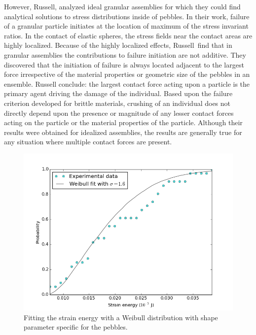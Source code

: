 However, Russell\etal, analyzed ideal granular assemblies for which they could find analytical solutions to stress distributions inside of pebbles.\cite{Russell2009} In their work, failure of a granular particle initiates at the location of maximum of the stress invariant ratios. In the contact of elastic spheres, the stress fields near the contact areas are highly localized. Because of the highly localized effects, Russell\etal~find that in granular assemblies the contributions to failure initiation are not additive. They discovered that the initiation of failure is always located adjacent to the largest force irrespective of the material properties or geometric size of the pebbles in an ensemble. Russell\etal\cite{Russell2009} conclude: the largest contact force acting upon a particle is the primary agent driving the damage of the individual. Based upon the failure criterion developed for brittle materials, crushing of an individual does not directly depend upon the presence or magnitude of any lesser contact forces acting on the particle or the material properties of the particle. Although their results were obtained for idealized assemblies, the results are generally true for any situation where multiple contact forces are present.

\begin{figure}[!t]
\centering
    \includegraphics[width=\doubleimagewidth]{chapters/figures/fzk-w-cdf-fit.png}
    \caption{Fitting the strain energy with a Weibull distribution with shape parameter specific for the \lis pebbles.}
    \label{fig:fzk-w-cdf}
\end{figure}

